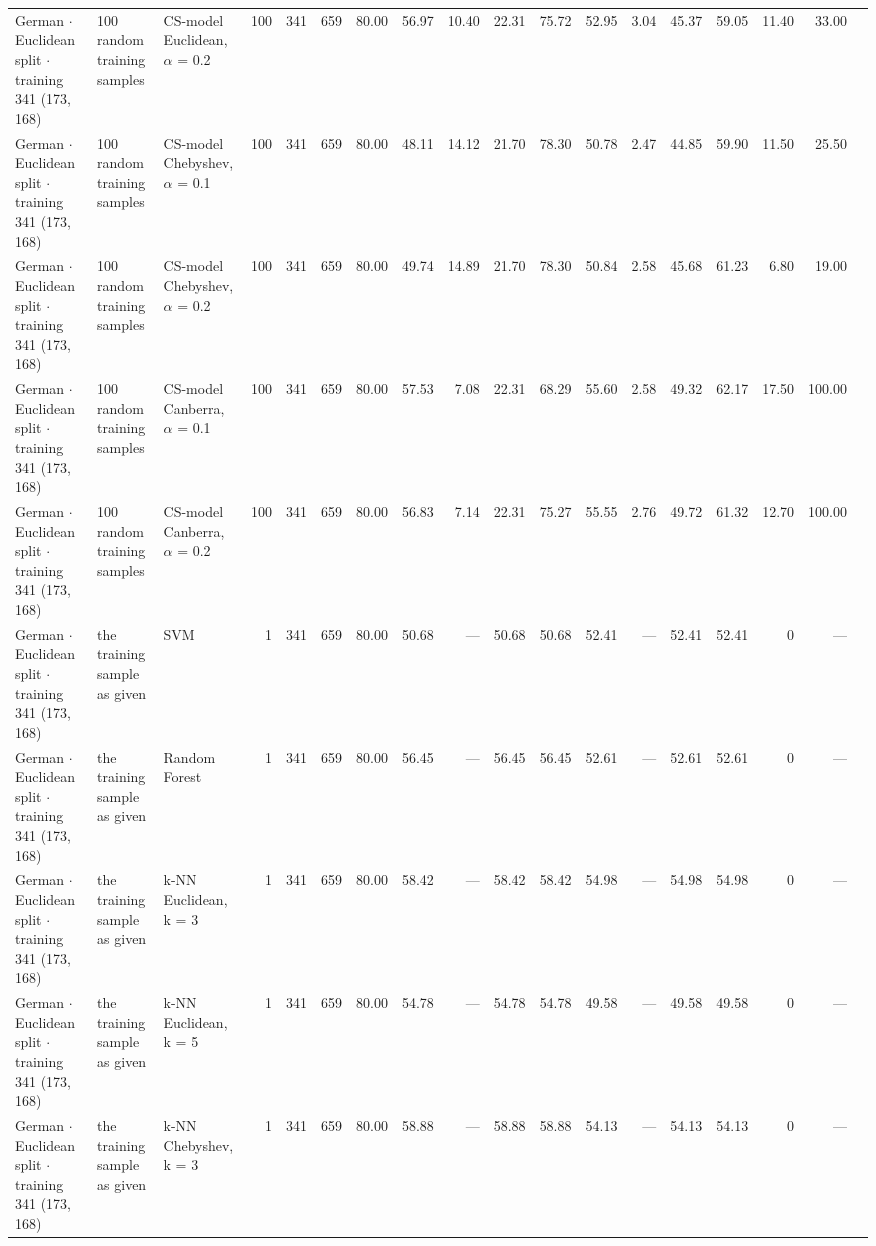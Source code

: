 \begin{longtable}{lllrrrrrrrrrrrrrrl}
  German $\cdot$ Euclidean split $\cdot$ training 341 (173, 168) & 100 random training samples & CS-model Euclidean, $\alpha$ = 0.2 & 100 & 341 & 659 & 80.00 & 56.97 & 10.40 & 22.31 & 75.72 & 52.95 & 3.04 & 45.37 & 59.05 & 11.40 & 33.00 &  \\
  German $\cdot$ Euclidean split $\cdot$ training 341 (173, 168) & 100 random training samples & CS-model Chebyshev, $\alpha$ = 0.1 & 100 & 341 & 659 & 80.00 & 48.11 & 14.12 & 21.70 & 78.30 & 50.78 & 2.47 & 44.85 & 59.90 & 11.50 & 25.50 &  \\
  German $\cdot$ Euclidean split $\cdot$ training 341 (173, 168) & 100 random training samples & CS-model Chebyshev, $\alpha$ = 0.2 & 100 & 341 & 659 & 80.00 & 49.74 & 14.89 & 21.70 & 78.30 & 50.84 & 2.58 & 45.68 & 61.23 & 6.80 & 19.00 &  \\
  German $\cdot$ Euclidean split $\cdot$ training 341 (173, 168) & 100 random training samples & CS-model Canberra, $\alpha$ = 0.1 & 100 & 341 & 659 & 80.00 & 57.53 & 7.08 & 22.31 & 68.29 & 55.60 & 2.58 & 49.32 & 62.17 & 17.50 & 100.00 &  \\
  German $\cdot$ Euclidean split $\cdot$ training 341 (173, 168) & 100 random training samples & CS-model Canberra, $\alpha$ = 0.2 & 100 & 341 & 659 & 80.00 & 56.83 & 7.14 & 22.31 & 75.27 & 55.55 & 2.76 & 49.72 & 61.32 & 12.70 & 100.00 &  \\
  German $\cdot$ Euclidean split $\cdot$ training 341 (173, 168) & the training sample as given & SVM & 1 & 341 & 659 & 80.00 & 50.68 & --- & 50.68 & 50.68 & 52.41 & --- & 52.41 & 52.41 & 0 & --- &  \\
  German $\cdot$ Euclidean split $\cdot$ training 341 (173, 168) & the training sample as given & Random Forest & 1 & 341 & 659 & 80.00 & 56.45 & --- & 56.45 & 56.45 & 52.61 & --- & 52.61 & 52.61 & 0 & --- &  \\
  German $\cdot$ Euclidean split $\cdot$ training 341 (173, 168) & the training sample as given & k-NN Euclidean, k = 3 & 1 & 341 & 659 & 80.00 & 58.42 & --- & 58.42 & 58.42 & 54.98 & --- & 54.98 & 54.98 & 0 & --- &  \\
  German $\cdot$ Euclidean split $\cdot$ training 341 (173, 168) & the training sample as given & k-NN Euclidean, k = 5 & 1 & 341 & 659 & 80.00 & 54.78 & --- & 54.78 & 54.78 & 49.58 & --- & 49.58 & 49.58 & 0 & --- &  \\
  German $\cdot$ Euclidean split $\cdot$ training 341 (173, 168) & the training sample as given & k-NN Chebyshev, k = 3 & 1 & 341 & 659 & 80.00 & 58.88 & --- & 58.88 & 58.88 & 54.13 & --- & 54.13 & 54.13 & 0 & --- &  \\

\end{longtable}
